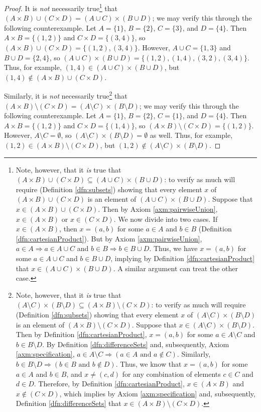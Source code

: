 \documentclass[../main.tex]{subfiles}
\begin{document}
\begin{enumerate}[ref={\thesection.\arabic*}]
\begin{proof}
        It is \emph{not} necessarily true\footnote{Note, however, that it \emph{is} true that $(A\times B)\cup(C\times D)\subseteq(A\cup C)\times(B\cup D)$: to verify as much will require (Definition \ref{dfn:subsets}) showing that every element $x$ of $(A\times B)\cup(C\times D)$ is an element of $(A\cup C)\times(B\cup D)$. Suppose that $x\in(A\times B)\cup(C\times D)$. Then by Axiom \ref{axm:pairwiseUnion}, $x\in(A\times B)$ or $x\in(C\times D)$. We now divide into two cases. If $x\in(A\times B)$, then $x=(a,b)$ for some $a\in A$ and $b\in B$ (Definition \ref{dfn:cartesianProduct}). But by Axiom \ref{axm:pairwiseUnion}, $a\in A \Longrightarrow a\in A\cup C$ and $b\in B \Longrightarrow b\in B\cup D$. Thus, we have $x=(a,b)$ for some $a\in A\cup C$ and $b\in B\cup D$, implying by Definition \ref{dfn:cartesianProduct} that $x\in(A\cup C)\times(B\cup D)$. A similar argument can treat the other case.} that $(A\times B)\cup(C\times D)=(A\cup C)\times(B\cup D)$; we may verify this through the following counterexample. Let $A=\{1\}$, $B=\{2\}$, $C=\{3\}$, and $D=\{4\}$. Then $A\times B=\{(1,2)\}$ and $C\times D=\{(3,4)\}$, so $(A\times B)\cup(C\times D)=\{(1,2),(3,4)\}$. However, $A\cup C=\{1,3\}$ and $B\cup D=\{2,4\}$, so $(A\cup C)\times(B\cup D)=\{(1,2),(1,4),(3,2),(3,4)\}$. Thus, for example, $(1,4)\in(A\cup C)\times(B\cup D)$, but $(1,4)\notin(A\times B)\cup(C\times D)$.\par
        Similarly, it is \emph{not} necessarily true\footnote{Note, however, that it \emph{is} true that $(A\setminus C)\times(B\setminus D)\subseteq(A\times B)\setminus(C\times D)$: to verify as much will require (Definition \ref{dfn:subsets}) showing that every element $x$ of $(A\setminus C)\times(B\setminus D)$ is an element of $(A\times B)\setminus(C\times D)$. Suppose that $x\in(A\setminus C)\times(B\setminus D)$. Then by Definition \ref{dfn:cartesianProduct}, $x=(a,b)$ for some $a\in A\setminus C$ and $b\in B\setminus D$. By Definition \ref{dfn:differenceSets} and, subsequently, Axiom \ref{axm:specification}, $a\in A\setminus C \Longrightarrow (a\in A\text{ and }a\notin C)$. Similarly, $b\in B\setminus D \Longrightarrow (b\in B\text{ and }b\notin D)$. Thus, we know that $x=(a,b)$ for some $a\in A$ and $b\in B$, and $x\neq(c,d)$ for any combination of elements $c\in C$ and $d\in D$. Therefore, by Definition \ref{dfn:cartesianProduct}, $x\in(A\times B)$ and $x\notin(C\times D)$, which implies by Axiom \ref{axm:specification} and, subsequently, Definition \ref{dfn:differenceSets} that $x\in(A\times B)\setminus(C\times D)$.} that $(A\times B)\setminus(C\times D)=(A\setminus C)\times(B\setminus D)$; we may verify this through the following counterexample. Let $A=\{1\}$, $B=\{2\}$, $C=\{1\}$, and $D=\{4\}$. Then $A\times B=\{(1,2)\}$ and $C\times D=\{(1,4)\}$, so $(A\times B)\setminus(C\times D)=\{(1,2)\}$. However, $A\setminus C=\emptyset$, so $(A\setminus C)\times(B\setminus D)=\emptyset$ as well. Thus, for example, $(1,2)\in(A\times B)\setminus(C\times D)$, but $(1,2)\notin(A\setminus C)\times(B\setminus D)$.

\end{proof}
\end{enumerate}
\end{document}
